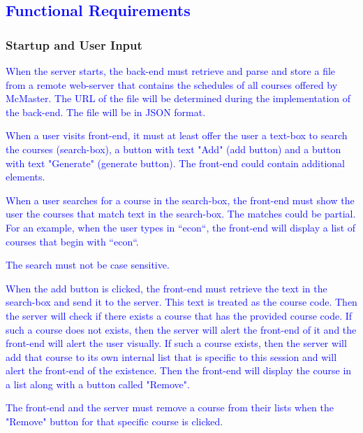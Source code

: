 \documentclass[12pt]{article}
\begin{document}
\newpage

\subsection{\textcolor{blue}{Functional Requirements}}

\subsubsection{Startup and User Input}
\begin{enumerate}
    \item \textcolor{blue}{When the server starts, the back-end must retrieve and parse and store a file from a remote web-server that contains the schedules of all courses offered by McMaster. The URL of the file will be determined during the implementation of the back-end. The file will be in JSON format.}
    \item \textcolor{blue}{When a user visits front-end, it must at least offer the user a text-box to search the courses (search-box), a button with text "Add" (add button) and a button with text "Generate" (generate button). The front-end could contain additional elements.}
    \item \textcolor{blue}{When a user searches for a course in the search-box, the front-end must show the user the courses that match text in the search-box. The matches could be partial. For an example, when the user types in ``econ``, the front-end will display a list of courses that begin with ``econ``.}
    \item \textcolor{blue}{ The search must not be case sensitive.}
    \item \textcolor{blue}{ When the add button is clicked, the front-end must retrieve the text in the search-box and send it to the server. This text is treated as the course code. Then the server will check if there exists a course that has the provided course code. If such a course does not exists, then the server will alert the front-end of it and the front-end will alert the user visually. If such a course exists, then the server will add that course to its own internal list that is specific to this session and will alert the front-end of the existence. Then the front-end will display the course in a list along with a button called "Remove".
    \item The front-end and the server must remove a course from their lists when the "Remove" button for that specific course is clicked.}
\end{enumerate}
\end{document}
